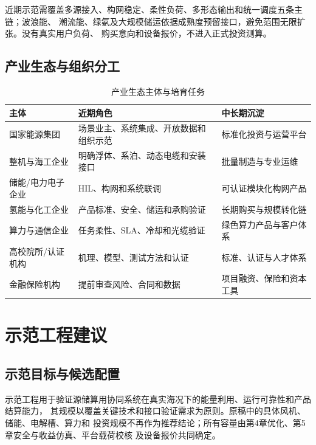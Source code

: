 近期示范需覆盖多源接入、构网稳定、柔性负荷、多形态输出和统一调度五条主链；波浪能、
潮流能、绿氨及大规模储运依据成熟度预留接口，避免范围无限扩张。没有真实用户负荷、
购买意向和设备报价，不进入正式投资测算。

\subsection{产业生态与组织分工}

\begin{table}[H]
\centering
\caption{产业生态主体与培育任务}
\label{tab:c6-ecosystem}
\small
\begin{tabularx}{\textwidth}{p{2.7cm} X X}
\toprule
主体 & 近期角色 & 中长期沉淀\\
\midrule
国家能源集团 & 场景业主、系统集成、开放数据和组织示范 & 标准化投资与运营平台\\
整机与海工企业 & 明确浮体、系泊、动态电缆和安装接口 & 批量制造与专业运维\\
储能/电力电子企业 & HIL、构网和系统联调 & 可认证模块化构网产品\\
氢能与化工企业 & 产品标准、安全、储运和承购验证 & 长期购买与规模转化链\\
算力与通信企业 & 任务柔性、SLA、冷却和光缆验证 & 绿色算力产品与客户体系\\
高校院所/认证机构 & 机理、模型、测试方法和认证 & 标准、认证与人才体系\\
金融保险机构 & 提前审查风险、合同和数据 & 项目融资、保险和资本工具\\
\bottomrule
\end{tabularx}
\end{table}

\section{示范工程建议}

\subsection{示范目标与候选配置}

示范工程用于验证源储算用协同系统在真实海况下的能量利用、运行可靠性和产品结算能力，
其规模以覆盖关键技术和接口验证需求为原则。原稿中的具体风机、储能、电解槽、算力和
投资规模不再作为推荐结论；所有容量由第4章优化、第5章安全与收益仿真、平台载荷校核
及设备报价共同确定。

